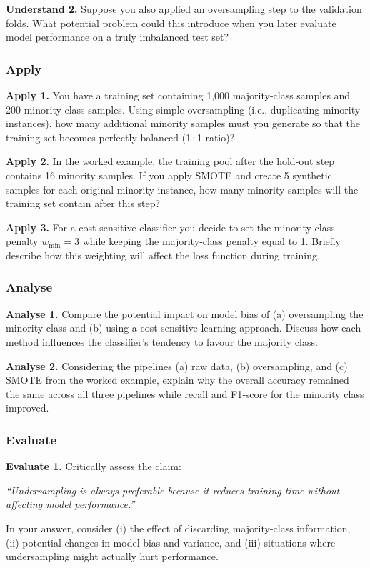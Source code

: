 \documentclass[12pt, a4paper]{article}
\begin{document}
\textbf{Understand 2.} Suppose you also applied an oversampling step to the validation folds.  What potential problem could this introduce when you later evaluate model performance on a truly imbalanced test set?  

\newpage
\subsubsection{Apply}
\textbf{Apply 1.} You have a training set containing 1,000 majority‑class samples and 200 minority‑class samples.  Using simple oversampling (i.e., duplicating minority instances), how many additional minority samples must you generate so that the training set becomes perfectly balanced (1 : 1 ratio)?  

\textbf{Apply 2.} In the worked example, the training pool after the hold‑out step contains 16 minority samples.  If you apply SMOTE and create 5 synthetic samples for each original minority instance, how many minority samples will the training set contain after this step?  

\textbf{Apply 3.} For a cost‑sensitive classifier you decide to set the minority‑class penalty \(w_{\text{min}} = 3\) while keeping the majority‑class penalty equal to 1.  Briefly describe how this weighting will affect the loss function during training.  

\newpage
\subsubsection{Analyse}
\textbf{Analyse 1.} Compare the potential impact on model bias of (a) oversampling the minority class and (b) using a cost‑sensitive learning approach.  Discuss how each method influences the classifier’s tendency to favour the majority class.  

\textbf{Analyse 2.} Considering the pipelines (a) raw data, (b) oversampling, and (c) SMOTE from the worked example, explain why the overall accuracy remained the same across all three pipelines while recall and F1‑score for the minority class improved.  

\newpage
\subsubsection{Evaluate}
\textbf{Evaluate 1.} Critically assess the claim:  

\emph{“Undersampling is always preferable because it reduces training time without affecting model performance.”}  

In your answer, consider (i) the effect of discarding majority‑class information, (ii) potential changes in model bias and variance, and (iii) situations where undersampling might actually hurt performance.  

\newpage
\end{document}
